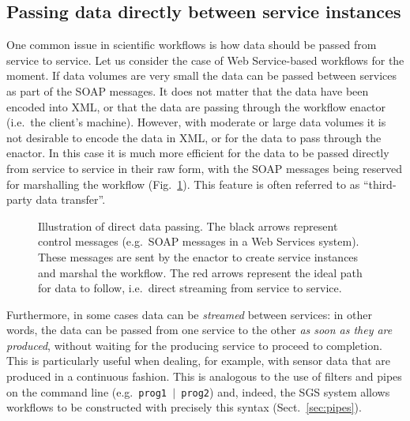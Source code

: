 \documentclass{llncs}
\begin{document}
\subsection{Passing data directly between service instances}\label{sec:datastreaming}
One common issue in scientific workflows is how data should be passed from service to service.  Let us consider the case of Web Service-based workflows for the moment.  If data volumes are very small the data can be passed between services as part of the SOAP messages.  It does not matter that the data have been encoded into XML, or that the data are passing through the workflow enactor (i.e.\ the client's machine).  However, with moderate or large data volumes it is not desirable to encode the data in XML, or for the data to pass through the enactor.  In this case it is much more efficient for the data to be passed directly from service to service in their raw form, with the SOAP messages being reserved for marshalling the workflow (Fig.~\ref{fig:datastreaming}).  This feature is often referred to as ``third-party data transfer''.

\begin{figure}
\caption{Illustration of direct data passing.  The black arrows represent control messages (e.g.\ SOAP messages in a Web Services system).  These messages are sent by the enactor to create service instances and marshal the workflow.  The red arrows represent the ideal path for data to follow, i.e.\ direct streaming from service to service.}\label{fig:datastreaming}
\end{figure}

Furthermore, in some cases data can be {\em streamed\/} between services: in other words, the data can be passed from one service to the other {\em as soon as they are produced\/}, without waiting for the producing service to proceed to completion.  This is particularly useful when dealing, for example, with sensor data that are produced in a continuous fashion.  This is analogous to the use of filters and pipes on the command line (e.g.\ {\tt prog1 $|$ prog2}) and, indeed, the SGS system allows workflows to be constructed with precisely this syntax (Sect.~\ref{sec:pipes}).
\end{document}
